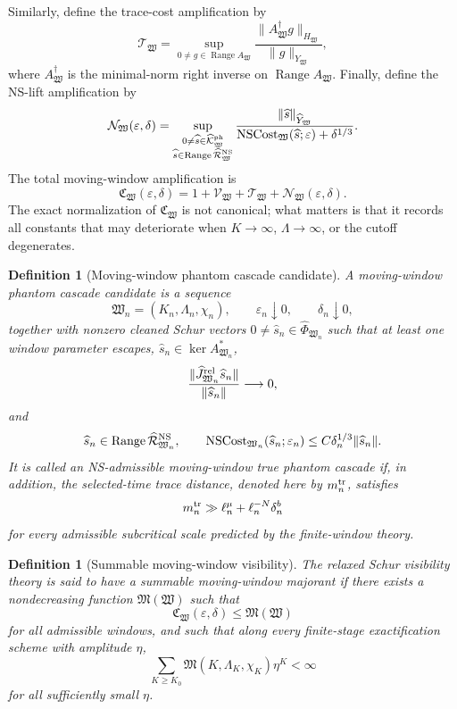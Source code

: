 \documentclass[11pt]{article}
\numberwithin{equation}{section}
\newtheorem{definition}[theorem]{Definition}
\DeclareMathOperator{\Range}{Range}
\newcommand{\eps}{\varepsilon}
\begin{document}
Similarly, define the trace-cost amplification by
\[
        \mathcal T_{\mathfrak W}
        =
        \sup_{0\neq g\in\Range A_{\mathfrak W}}
        \frac{\|A_{\mathfrak W}^{\dagger}g\|_{H_{\mathfrak W}}}
        {\|g\|_{Y_{\mathfrak W}}},
\]
where \(A_{\mathfrak W}^{\dagger}\) is the minimal-norm right inverse on \(\Range A_{\mathfrak W}\).  Finally, define the NS-lift amplification by
\[
        \mathcal N_{\mathfrak W}(\eps,\delta)
        =
        \sup_{\substack{0\neq \widehat s\in\widehat{\mathcal K}_{\mathfrak W}^{\rm ph}\\
        \widehat s\in\Range \widehat{\mathcal R}_{\mathfrak W}^{\rm NS}}}
        \frac{\|\widehat s\|_{\widehat Y_{\mathfrak W}}}
        {\operatorname{NSCost}_{\mathfrak W}(\widehat s;\eps)+\delta^{1/3}}.
\]
The total moving-window amplification is
\[
        \mathfrak C_{\mathfrak W}(\eps,\delta)
        =1+\mathcal V_{\mathfrak W}+\mathcal T_{\mathfrak W}
        +\mathcal N_{\mathfrak W}(\eps,\delta).
\]
The exact normalization of \(\mathfrak C_{\mathfrak W}\) is not canonical; what matters is that it records all constants that may deteriorate when \(K\to\infty\), \(\Lambda\to\infty\), or the cutoff degenerates.

\begin{definition}[Moving-window phantom cascade candidate]\label{def:moving-window-phantom-cascade}
A moving-window phantom cascade candidate is a sequence
\[
        \mathfrak W_n=(K_n,\Lambda_n,\chi_n),
        \qquad
        \eps_n\downarrow0,
        \qquad
        \delta_n\downarrow0,
\]
together with nonzero cleaned Schur vectors \(0\neq\widehat s_n\in\widehat\Phi_{\mathfrak W_n}\) such that at least one window parameter escapes, \(\widehat s_n\in\ker A_{\mathfrak W_n}^*\),
\[
        \frac{\|\widehat J_{\mathfrak W_n}^{\rm rel}\widehat s_n\|}
        {\|\widehat s_n\|}\longrightarrow0,
\]
and
\[
        \widehat s_n\in\Range \widehat{\mathcal R}_{\mathfrak W_n}^{\rm NS},
        \qquad
        \operatorname{NSCost}_{\mathfrak W_n}(\widehat s_n;\eps_n)
        \le C\delta_n^{1/3}\|\widehat s_n\|.
\]
It is called an NS-admissible moving-window true phantom cascade if, in addition, the selected-time trace distance, denoted here by \(m_n^{\rm tr}\), satisfies
\[
        m_n^{\rm tr}
        \gg
        \ell_n^\mu+\ell_n^{-N}\delta_n^b
\]
for every admissible subcritical scale predicted by the finite-window theory.
\end{definition}

\begin{definition}[Summable moving-window visibility]\label{def:summable-moving-window-visibility}
The relaxed Schur visibility theory is said to have a summable moving-window majorant if there exists a nondecreasing function \(\mathfrak M(\mathfrak W)\) such that
\[
        \mathfrak C_{\mathfrak W}(\eps,\delta)\le \mathfrak M(\mathfrak W)
\]
for all admissible windows, and such that along every finite-stage exactification scheme with amplitude \(\eta\),
\[
        \sum_{K\ge K_0}\mathfrak M(K,\Lambda_K,\chi_K)\eta^K<\infty
\]
for all sufficiently small \(\eta\).
\end{definition}
\end{document}
